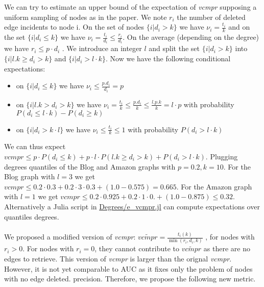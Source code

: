 \documentclass{article}
\begin{document}
We can try to estimate an upper bound of the expectation of \textit{vcmpr} supposing a uniform sampling of nodes as in the paper.
We note $r_{i}$ the number of deleted edge incidents to node i.
On the set of nodes $\{i | d_{i} > k\}$ we have $ \nu_{i} = \frac{t_{i}}{k} $ and on the set $\{i | d_{i} \leq k\}$  we have  $ \nu_{i} = \frac{t_{i}}{d_{i}} \leq \frac{r_{i}}{d_{i}}$.
On the average (depending on the degree) we have $ r_{i} \leq p \cdot d_{i} $ . We introduce an integer $l$ and split the set $ \{ i | d_{i} > k  \}$ into  $ \{ i | l . k \ge d_{i} > k  \}$ and $ \{ i |  d_{i} > l \cdot k \}$. Now we have the following conditional expectations:
\begin{itemize}
    \item  on $\{i | d_{i} \leq k\}$ we have $ \nu_{i} \leq \frac{p . d_{i}}{d_{i}} = p$
    \item on  $ \{ i | l . k > d_{i} > k  \}$ we have $ \nu_{i} = \frac{t_{i}}{k} \leq \frac{p.d_{i}}{k} \leq \frac{l.p.k}{k} = l \cdot p $ with probability $P(d_{i} \leq l \cdot k) - P(d_{i} \geq k)$
    \item on $\{i| d_{i} > k \cdot l \}$  we have $ \nu_{i} \leq \frac{t_{i}}{k} \leq 1 $ with probability $ P(d_{i} > l \cdot k) $
\end{itemize}

We can thus expect $ vcmpr \leq p \cdot P(d_{i} \leq k) + p \cdot l \cdot P(l . k \geq d_{i} > k ) + P(d_{i} > l \cdot k)$.
Plugging degrees quantiles of the Blog and Amazon graphs
with $p=0.2, k=10$. For the Blog graph with $l=3$ we get $vcmpr \leq  0.2 \cdot 0.3 + 0.2 \cdot 3 \cdot 0.3 + (1.0-0.575) = 0.665$.
For the Amazon graph with $l = 1$ we get $ vcmpr \leq 0.2 \cdot 0.925 + 0.2 \cdot 1 \cdot 0. + (1.0-0.875) \leq 0.32$.
Alternatively a Julia script in \href{https://github.com/jean-pierreBoth/linkauc/tree/master/Degrees}{\color{blue}Degrees/e\_vcmpr.jl} can compute expectations over quantiles degrees.

\paragraph{}

We proposed a modified version of \textit{vcmpr}: $ \widetilde{vcmpr} = \frac{t_{i}(k)}{\min(r_{i}, d_{i}, k)}$ , for nodes with $ r_{i} > 0 $. For nodes with $ r_{i} = 0 $, they cannot contribute to $\widetilde{vcmpr}$  as there are no edges to retrieve.
This version of \textit{vcmpr} is larger than the orignal \textit{vcmpr}. However, it is not yet comparable to AUC as it fixes only the problem of nodes with no edge deleted.
precision. Therefore, we propose the following new metric.
\end{document}
